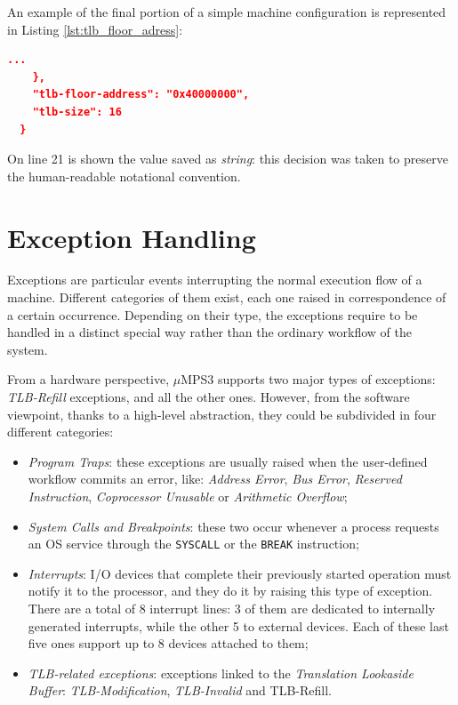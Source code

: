 \documentclass[12pt,a4paper,openright,twoside]{report}
\begin{document}
\clearpage
An example of the final portion of a simple machine configuration is represented in Listing \ref{lst:tlb_floor_adress}:
\begin{lstlisting}[language=json,firstnumber=19,caption={TLB Floor Address},captionpos=b,label={lst:tlb_floor_adress}]
    ...
    },
    "tlb-floor-address": "0x40000000",
    "tlb-size": 16
  }
  \end{lstlisting}
On line 21 is shown the value saved as \textit{string}: this decision was taken to preserve the human-readable notational convention.

\chapter{Exception Handling}
\label{chap:exception_handling}
\lhead[\fancyplain{}{\bfseries\thepage}]{\fancyplain{}{\bfseries\rightmark}}
Exceptions are particular events interrupting the normal execution flow of a machine.
Different categories of them exist, each one raised in correspondence of a certain occurrence.
Depending on their type, the exceptions require to be handled in a distinct special way rather than the ordinary workflow of the system.

From a hardware perspective, $\mu$MPS3 supports two major types of exceptions: \textit{TLB-Refill} exceptions, and all the other ones.
However, from the software viewpoint, thanks to a high-level abstraction, they could be subdivided in four different categories:
\begin{itemize}
	\item \textit{Program Traps}: these exceptions are usually raised when the user-defined workflow commits an error, like: \textit{Address Error}, \textit{Bus Error}, \textit{Reserved Instruction}, \textit{Coprocessor Unusable} or \textit{Arithmetic Overflow};
	\item \textit{System Calls and Breakpoints}: these two occur whenever a process requests an OS service through the \texttt{SYSCALL} or the \texttt{BREAK} instruction;
	\item \textit{Interrupts}: I/O devices that complete their previously started operation must notify it to the processor, and they do it by raising this type of exception.
	      There are a total of 8 interrupt lines: 3 of them are dedicated to internally generated interrupts, while the other 5 to external devices.
	      Each of these last five ones support up to 8 devices attached to them;
	\item \textit{TLB-related exceptions}: exceptions linked to the \textit{Translation Lookaside Buffer}: \textit{TLB-Modification}, \textit{TLB-Invalid} and TLB-Refill.
\end{itemize}
\end{document}
